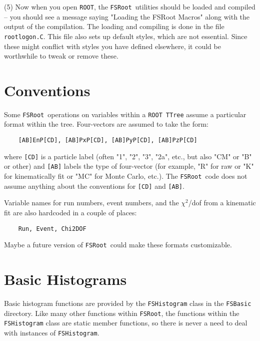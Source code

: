 \documentclass[11pt]{article}
\newcommand{\FSR}{{\tt FSRoot}}
\newcommand{\ROOT}{{\tt ROOT}}
\begin{document}
(5) Now when you open \ROOT, the \FSR\ utilities should be loaded and compiled -- you should see a message saying "Loading the FSRoot Macros" along with the output of the compilation.  The loading and compiling is done in the file {\tt rootlogon.C}.  This file also sets up default styles, which are not essential.  Since these might conflict with styles you have defined elsewhere, it could be worthwhile to tweak or remove these.

\section{Conventions}
\label{sec:conventions}

Some \FSR\ operations on variables within a \ROOT\ {\tt TTree} assume a particular format within the tree.  Four-vectors are assumed to take the form:
\begin{verbatim}
    [AB]EnP[CD], [AB]PxP[CD], [AB]PyP[CD], [AB]PzP[CD]
\end{verbatim}
where {\tt [CD]} is a particle label (often "1", "2", "3", "2a", etc., but also "CM" or "B" or other) and {\tt [AB]} labels the type of four-vector (for example, "R" for raw or "K" for kinematically fit or "MC" for Monte Carlo, etc.).  The \FSR\ code does not assume anything about the conventions for {\tt [CD]} and {\tt [AB]}.

Variable names for run numbers, event numbers, and the $\chi^2$/dof from a kinematic fit are also hardcoded in a couple of places:
\begin{verbatim}
    Run, Event, Chi2DOF
\end{verbatim}
Maybe a future version of \FSR\ could make these formats customizable.

\section{Basic Histograms}
\label{sec:hist}

Basic histogram functions are provided by the {\tt FSHistogram} class in the {\tt FSBasic} directory.  Like many other functions within \FSR, the functions within the {\tt FSHistogram} class are static member functions, so there is never a need to deal with instances of {\tt FSHistogram}.
\end{document}
